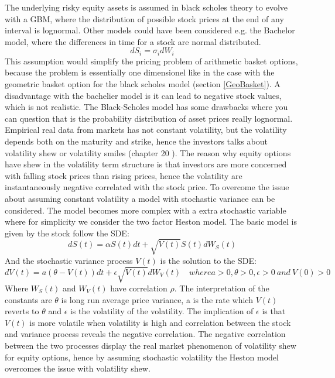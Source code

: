 The underlying risky equity assets is assumed in black scholes theory to evolve with a GBM, where the distribution of possible stock prices at the end of any interval is lognormal. Other models could have been considered e.g. the Bachelor model, where the differences in time for a stock are normal distributed. 
\begin{equation*}
dS_i=\sigma_i dW_i
\end{equation*}
This assumption would simplify the pricing problem of arithmetic basket options, because the problem is essentially one dimensionel like in the case with the geometric basket option for the black scholes model (section \ref{GeoBasket}). A disadvantage with the bachelier model is it can lead to negative stock values, which is not realistic. The Black-Scholes model has some drawbacks where you can question that is the probability distribution of asset prices really lognormal. \\

Empirical real data from markets has not constant volatility, but the volatility depends both on the maturity and strike, hence the investors talks about volatility shew or volatility smiles (chapter 20 \parencite{Hull}). The reason why equity options have shew in the volatility term structure is that investors are more concerned with falling stock prices than rising prices, hence the volatility are instantaneously negative correlated with the stock price. To overcome the issue about assuming constant volatility a model with stochastic variance can be considered. The model becomes more complex with a extra stochastic variable where for simplicity we consider the two factor Heston model. The basic model is given by the stock follow the SDE:
$$dS(t)=\alpha S(t) dt + \sqrt{V(t)} S(t) dW_S(t)$$
And the stochastic variance process $V(t)$ is the solution to the SDE:
$$dV(t)=a(\theta - V(t))dt + \epsilon \sqrt{V(t)} dW_V(t) \quad where a>0,\theta>0, \epsilon>0 \ and \ V(0)>0$$
Where $W_S(t)$ and $W_V(t)$ have correlation $\rho$. The interpretation of the constants are $\theta$ is long run average price variance, a is the rate which $V(t)$ reverts to $\theta$ and $\epsilon$ is the volatility of the volatility. The implication of $\epsilon$ is that $V(t)$ is more volatile when volatility is high and correlation between the stock and variance process reveals the negative correlation. The negative correlation between the two processes display the real market phenomenon of volatility shew for equity options, hence by assuming stochastic volatility the Heston model overcomes the issue with volatility shew.\\

